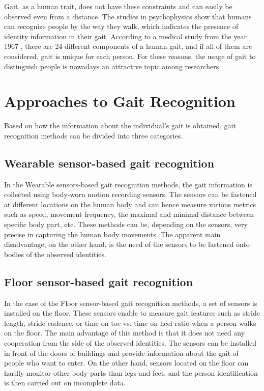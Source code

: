 Gait, as a human trait, does not have these constraints and can easily be observed even from a distance. The studies in psychophysics \cite{friend_by_gait} show that humans can recognize people by the way they walk, which indicates the presence of identity information in their gait. According to a medical study from the year 1967 \cite{gait_total_pattern}, there are 24 different components of a human gait, and if all of them are considered, gait is unique for each person. For these reasons, the usage of gait to distinguish people is nowadays an attractive topic among researchers. 

\section{Approaches to Gait Recognition}
Based on how the information about the individual's gait is obtained, gait recognition methods can be divided into three categories.
\subsection{Wearable sensor-based gait recognition}
In the Wearable sensors-based gait recognition methods, the gait information is collected using body-worn motion recording sensors. The sensors can be fastened at different locations on the human body and can hence measure various metrics such as speed, movement frequency, the maximal and minimal distance between specific body part, etc. These methods can be, depending on the sensors, very precise in capturing the human body movements. The apparent main disadvantage, on the other hand, is the need of the sensors to be fastened onto bodies of the observed identities.
\subsection{Floor sensor-based gait recognition}
In the case of the Floor sensor-based gait recognition methods, a set of sensors is installed on the floor. These sensors enable to measure gait features such as stride length, stride cadence, or time on toe vs. time on heel ratio when a person walks on the floor. The main advantage of this method is that it does not need any cooperation from the side of the observed identities. The sensors can be installed in front of the doors of buildings and provide information about the gait of people who want to enter. On the other hand, sensors located on the floor can hardly monitor other body parts than legs and feet, and the person identification is then carried out on incomplete data.
